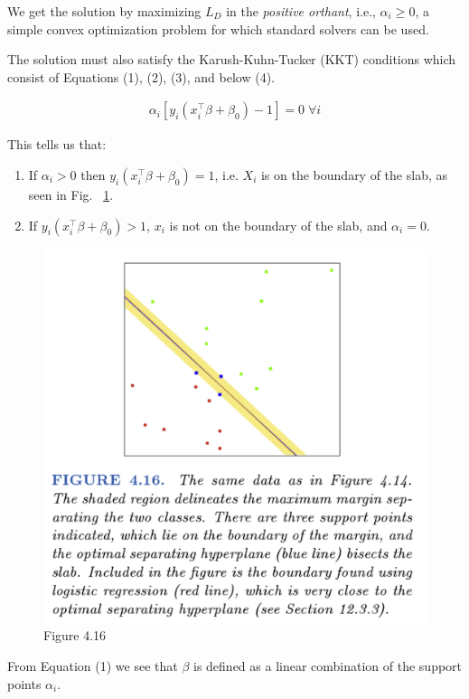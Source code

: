 \documentclass[a4paper]{article}
\begin{document}
We get the solution by maximizing $L_D$ in the \emph{positive orthant}, i.e., $\alpha_i \geq 0$, a simple convex optimization problem for which standard solvers can be used.

The solution must also satisfy the Karush-Kuhn-Tucker (KKT) conditions which consist of Equations (1), (2), (3), and below (4).

\begin{align}
\alpha_i [y_i (x_i^\top \beta + \beta_0) -1] = 0 \; \forall i
\end{align}

This tells us that:
\begin{enumerate}
\item If $\alpha_i > 0$ then $y_i (x_i^\top \beta + \beta_0) =1$, i.e. $X_i$ is on the boundary of the slab, as seen in Fig. ~\ref{fig:svm1}. 
\item If $y_i (x_i^\top \beta + \beta_0) > 1$, $x_i$ is not on the boundary of the slab, and $\alpha_i=0$.
\end{enumerate}

\begin{figure}
\centering
\includegraphics[width=1.0\textwidth]{fig4_16.png}
\caption{\label{fig:svm1}Figure 4.16}
\end{figure}

From Equation (1) we see that $\beta$ is defined as a linear combination of the support points $\alpha_i$.
\end{document}
